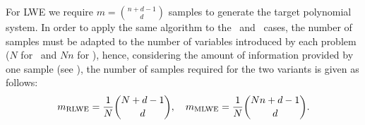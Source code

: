 
For LWE we require $m = \binom{n+d-1}{d}$ samples to generate the target polynomial system. In order to apply the same algorithm to the \rlwe\ and \mlwe\ cases, the number of samples must be adapted to the number of variables introduced by each problem ($N$ for \rlwe\ and $Nn$ for \mlwe), hence, considering the amount of information provided by one sample (see ), the number of samples required for the two variants is given as follows:
\begin{equation*}
  m_{\text{RLWE}} = \frac{1}{N}\dbinom{N+d-1}{d}, \ \ \ m_{\text{MLWE}} = \frac{1}{N}\dbinom{Nn+d-1}{d}.
\end{equation*}